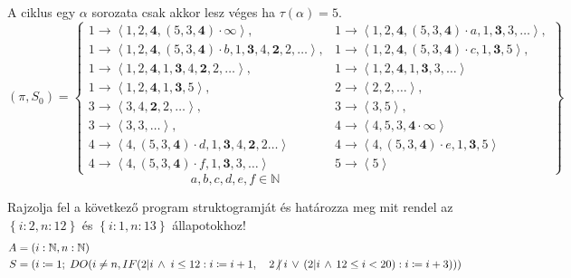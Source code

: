 \documentclass[a4paper,12pt]{article}
\theoremstyle{definition}
\begin{document}
	\begin{solution}
		A ciklus egy $ \alpha $ sorozata csak akkor lesz véges ha $ \tau(\alpha)=5 $.
		\[ (\pi, S_0) = \left\{ \begin{array}{ll}
			1 \rightarrow \left< 1,2,\mathbf{4},(5,3,\mathbf{4}) \cdot \infty \right>, &
			1 \rightarrow \left< 1,2, \mathbf{4}, (5, 3, \mathbf{4}) \cdot a, 1, \mathbf{3}, 3, \dots \right>, \\
			1 \rightarrow \left< 1,2, \mathbf{4}, (5, 3, \mathbf{4}) \cdot b, 1, \mathbf{3}, 4, \textbf{2}, 2, \dots \right>, &
			1 \rightarrow \left< 1,2, \textbf{4}, (5, 3, \mathbf{4}) \cdot c, 1, \mathbf{3}, 5 \right>, \\
			1 \rightarrow \left< 1,2, \mathbf{4}, 1, \mathbf{3}, 4, \mathbf{2}, 2, \dots\right>, &
			1 \rightarrow \left< 1,2, \mathbf{4}, 1, \mathbf{3}, 3, \dots \right> \\
			1 \rightarrow \left< 1,2, \mathbf{4}, 1, \mathbf{3}, 5 \right>, &
			2 \rightarrow \left< 2,2,\dots \right>, \\
			3 \rightarrow \left< 3,4,\mathbf{2},2,\dots \right>, &
			3 \rightarrow \left< 3,5 \right>, \\
			3 \rightarrow \left< 3,3,\dots \right>, &
			4 \rightarrow \left< 4,5,3,\mathbf{4}\cdot \infty \right> \\
			4 \rightarrow \left< 4,(5,3,\mathbf{4}) \cdot d, 1,\mathbf{3},4,\mathbf{2},2\dots \right> &
			4 \rightarrow \left< 4,(5,3,\mathbf{4}) \cdot e, 1,\mathbf{3},5 \right> \\
			4 \rightarrow \left< 4,(5,3,\mathbf{4}) \cdot f, 1,\mathbf{3},3,\dots \right> &
			5 \rightarrow \left< 5 \right>
		\end{array} \right\} \]
		\[ a,b,c,d,e,f \in \mathbb{N} \]   
	\end{solution}
	\setcounter{question}{5}
	\newpage
	\begin{question}
		Rajzolja fel a következő program struktogramját és határozza meg mit rendel az $ \left\lbrace i:2, n:12 \right\rbrace $ és $ \left\lbrace i:1, n:13 \right\rbrace $ állapotokhoz!
		\begin{align*}
			A &= (i: \mathbb{N}, n: \mathbb{N}) \\
			S &= (i \coloneq 1;\; DO(i \ne n, IF(2 | i \, \land \; i \le 12: i \coloneq i+1, \quad 2 \centernot | i \, \lor \, (2 | i \, \land \, 12 \le i < 20): i \coloneq i + 3)))
		\end{align*}
	\end{question}
\end{document}
